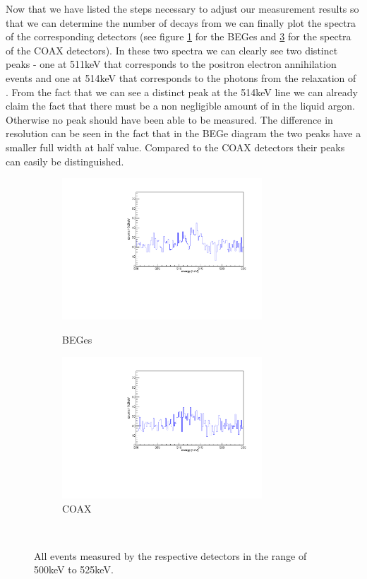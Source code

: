Now that we have listed the steps necessary to adjust our measurement results so that we can determine the number of decays from we can finally plot the spectra of the corresponding detectors (see figure \ref{fig:NoFilterBEGes} for the BEGes and \ref{fig:NoFilterCOAX} for the spectra of the COAX detectors). 
In these two spectra we can clearly see two distinct peaks - one at 511keV that corresponds to the positron electron annihilation events and one at 514keV that corresponds to the photons from the relaxation of .
From the fact that we can see a distinct peak at the 514keV line we can already claim the fact that there must be a non negligible amount of \Kr in the liquid argon.
Otherwise no peak should have been able to be measured. 
The difference in resolution can be seen in the fact that in the BEGe diagram the two peaks have a smaller full width at half value.
Compared to the COAX detectors their peaks can easily be distinguished.  
\\

\begin{figure}[t!]
\centering
\begin{subfigure}{.5\textwidth}
  \centering
	\includegraphics[width=75mm]{./Bilder/500525NoFilterBEGes.pdf}
  \label{fig:NoFilterBEGes}
  \caption{BEGes}
\end{subfigure}%
\begin{subfigure}{.5\textwidth}
  \centering
	\includegraphics[width=75mm]{./Bilder/500525NoFilterCOAX.pdf}
  \caption{COAX}
  \label{fig:NoFilterCOAX}
\end{subfigure}
    \\
	\vspace{0.5cm}
	\caption{All events measured by the respective detectors in the range of 500keV to 525keV.}
\end{figure}

